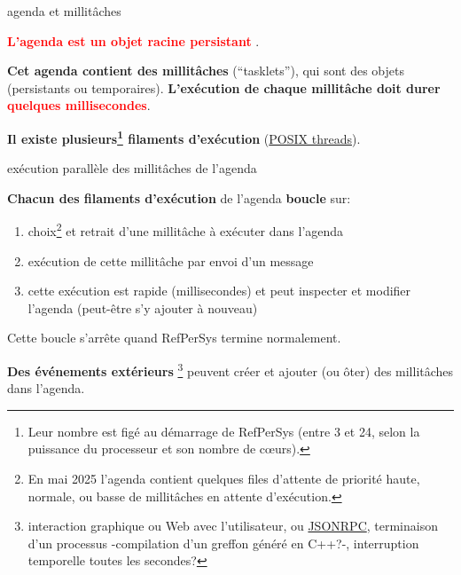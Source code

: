 \documentclass[final,a4,xcolor={svgnames,dvipsnames}]{beamer}
\begin{document}
 \begin{frame}{agenda et millitâches}

   \textbf{\textcolor{red}{L'agenda est un objet racine persistant}}
   .

   \bigskip

   \textbf{Cet agenda contient des millitâches} (``tasklets''), qui
   sont des objets (persistants ou temporaires). \textbf{L'exécution
     de chaque millitâche doit durer \textcolor{red}{quelques
       millisecondes}}.

     \textbf{Il existe plusieurs\footnote{Leur nombre est figé au
       démarrage de RefPerSys (entre 3 et 24, selon la puissance du
       processeur et son nombre de c{\oe}urs).} filaments d'exécution}
     (\href{https://fr.wikipedia.org/wiki/Threads_POSIX}{POSIX
       threads}).

 \end{frame}

 \begin{frame}{exécution parallèle des millitâches de l'agenda}

 \textbf{Chacun des filaments d'exécution} de l'agenda
  \textbf{boucle} sur:

     \begin{enumerate}
     \item choix\footnote{En mai 2025 l'agenda contient quelques files
     d'attente de priorité haute, normale, ou basse de millitâches en
     attente d'exécution.} et retrait d'une millitâche à exécuter dans
       l'agenda
     \item exécution de cette millitâche par envoi d'un message
       \item cette exécution est rapide (millisecondes) et peut
         inspecter et modifier l'agenda (peut-être s'y ajouter à nouveau)
     \end{enumerate}

     \bigskip
     
     Cette boucle {} s'arrête quand
     RefPerSys termine normalement.

     \bigskip
     \textbf{Des événements extérieurs} \footnote{interaction
     graphique ou Web avec l'utilisateur, ou
     \href{https://www.jsonrpc.org/}{JSONRPC}, terminaison d'un
     processus -compilation d'un greffon généré en C++?-, interruption
     temporelle toutes les secondes?}  peuvent créer et ajouter (ou
     ôter) des millitâches dans l'agenda.
   
 \end{frame}
 
\end{document}
